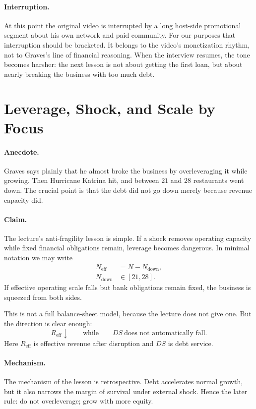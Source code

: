 \paragraph{Interruption.}
At this point the original video is interrupted by a long host-side promotional segment about his own network and paid community. For our purposes that interruption should be bracketed. It belongs to the video's monetization rhythm, not to Graves's line of financial reasoning. When the interview resumes, the tone becomes harsher: the next lesson is not about getting the first loan, but about nearly breaking the business with too much debt.

\section{Leverage, Shock, and Scale by Focus}

\paragraph{Anecdote.}
Graves says plainly that he almost broke the business by overleveraging it while growing. Then Hurricane Katrina hit, and between \(21\) and \(28\) restaurants went down. The crucial point is that the debt did not go down merely because revenue capacity did.

\paragraph{Claim.}
The lecture's anti-fragility lesson is simple. If a shock removes operating capacity while fixed financial obligations remain, leverage becomes dangerous. In minimal notation we may write
\begin{align}
N_{\mathrm{eff}} &= N - N_{\mathrm{down}},\\
N_{\mathrm{down}} &\in [21,28].
\end{align}
If effective operating scale falls but bank obligations remain fixed, the business is squeezed from both sides.

This is not a full balance-sheet model, because the lecture does not give one. But the direction is clear enough:
\begin{equation}
R_{\mathrm{eff}}\downarrow \qquad \text{while} \qquad DS \ \text{does not automatically fall.}
\end{equation}
Here \(R_{\mathrm{eff}}\) is effective revenue after disruption and \(DS\) is debt service.

\paragraph{Mechanism.}
The mechanism of the lesson is retrospective. Debt accelerates normal growth, but it also narrows the margin of survival under external shock. Hence the later rule: do not overleverage; grow with more equity.

